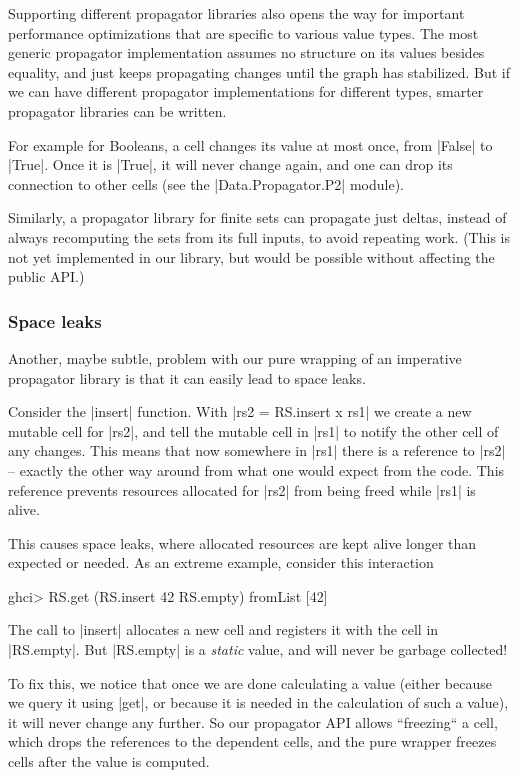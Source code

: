\documentclass[manuscript,review,screen,acmsmall]{acmart}
\begin{document}
Supporting different propagator libraries also opens the way for important performance optimizations that are specific to various value types. The most generic propagator implementation assumes no structure on its values besides equality, and just keeps propagating changes until the graph has stabilized. But if we can have different propagator implementations for different types, smarter propagator libraries can be written.

For example for Booleans, a cell changes its value at most once, from |False| to |True|. Once it is |True|, it will never change again, and one can drop its connection to other cells (see the |Data.Propagator.P2| module).

Similarly, a propagator library for finite sets can propagate just deltas, instead of always recomputing the sets from its full inputs, to avoid repeating work. (This is not yet implemented in our library, but would be possible without affecting the public API.)

\subsubsection{Space leaks}\label{sec:spaceleak}

Another, maybe subtle, problem with our pure wrapping of an imperative propagator library is that it can easily lead to space leaks.

Consider the |insert| function. With |rs2 = RS.insert x rs1| we create a new mutable cell for |rs2|, and tell the mutable cell in |rs1| to notify the other cell of any changes. This means that now somewhere in |rs1| there is a reference to |rs2| -- exactly the other way around from what one would expect from the code. This reference prevents resources allocated for |rs2| from being freed while |rs1| is alive.

This causes space leaks, where allocated resources are kept alive longer than expected or needed. As an extreme example, consider this interaction
\begin{code}
ghci> RS.get (RS.insert 42 RS.empty)
fromList [42]
\end{code}
The call to |insert| allocates a new cell and registers it with the cell in |RS.empty|. But |RS.empty| is a \emph{static} value, and will never be garbage collected!

To fix this, we notice that once we are done calculating a value (either because we query it using |get|, or because it is needed in the calculation of such a value), it will never change any further. So our propagator API allows “freezing“ a cell, which drops the references to the dependent cells, and the pure wrapper freezes cells after the value is computed.
\end{document}
